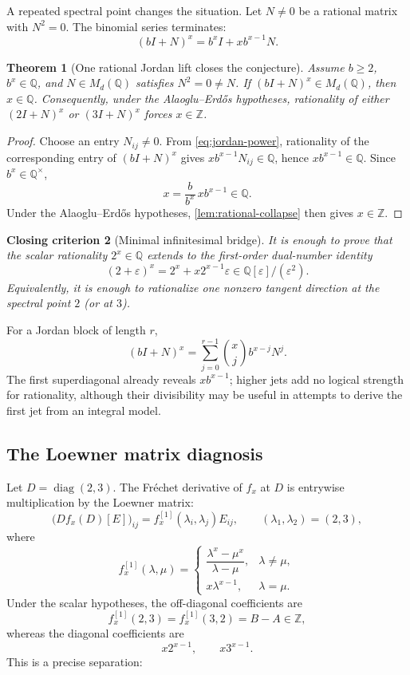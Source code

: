 \documentclass[11pt,oneside]{article}
\newtheorem{theorem}{Theorem}[section]
\newtheorem{criterion}[theorem]{Closing criterion}
\theoremstyle{definition}
\theoremstyle{remark}
\newcommand{\Z}{\mathbb Z}
\newcommand{\Q}{\mathbb Q}
\newcommand{\diag}{\operatorname{diag}}
\begin{document}
A repeated spectral point changes the situation.  Let \(N\neq0\) be a
rational matrix with \(N^2=0\).  The binomial series terminates:
\begin{equation}\label{eq:jordan-power}
        (bI+N)^x=b^xI+xb^{x-1}N.
\end{equation}

\begin{theorem}[One rational Jordan lift closes the conjecture]
\label{thm:jordan-closes}
Assume \(b\geq2\), \(b^x\in\Q\), and \(N\in M_d(\Q)\) satisfies
\(N^2=0\neq N\).  If \((bI+N)^x\in M_d(\Q)\), then \(x\in\Q\).
Consequently, under the Alaoglu--Erd\H{o}s hypotheses, rationality of
either \((2I+N)^x\) or \((3I+N)^x\) forces \(x\in\Z\).
\end{theorem}

\begin{proof}
Choose an entry \(N_{ij}\neq0\).  From
\eqref{eq:jordan-power}, rationality of the corresponding entry of
\((bI+N)^x\) gives \(xb^{x-1}N_{ij}\in\Q\), hence
\(xb^{x-1}\in\Q\).  Since \(b^x\in\Q^\times\),
\[
        x=\frac{b}{b^x}\,xb^{x-1}\in\Q.
\]
Under the Alaoglu--Erd\H{o}s hypotheses,
\cref{lem:rational-collapse} then gives \(x\in\Z\).
\end{proof}

\begin{criterion}[Minimal infinitesimal bridge]\label{crit:first-jet}
It is enough to prove that the scalar rationality \(2^x\in\Q\) extends
to the first-order dual-number identity
\[
        (2+\varepsilon)^x
        =2^x+x2^{x-1}\varepsilon
        \in\Q[\varepsilon]/(\varepsilon^2).
\]
Equivalently, it is enough to rationalize one nonzero tangent direction
at the spectral point \(2\) (or at \(3\)).
\end{criterion}

For a Jordan block of length \(r\),
\[
 (bI+N)^x
 =\sum_{j=0}^{r-1}\binom{x}{j}b^{x-j}N^j.
\]
The first superdiagonal already reveals \(xb^{x-1}\); higher jets add no
logical strength for rationality, although their divisibility may be
useful in attempts to derive the first jet from an integral model.

\subsection{The Loewner matrix diagnosis}

Let \(D=\diag(2,3)\).  The Fr\'echet derivative of \(f_x\) at \(D\) is
entrywise multiplication by the Loewner matrix:
\[
        \bigl(Df_x(D)[E]\bigr)_{ij}
        =f_x^{[1]}(\lambda_i,\lambda_j)E_{ij},
        \qquad(\lambda_1,\lambda_2)=(2,3),
\]
where
\[
 f_x^{[1]}(\lambda,\mu)=
 \begin{cases}
 \dfrac{\lambda^x-\mu^x}{\lambda-\mu},&\lambda\neq\mu,\\[1.2ex]
 x\lambda^{x-1},&\lambda=\mu.
 \end{cases}
\]
Under the scalar hypotheses, the off-diagonal coefficients are
\[
        f_x^{[1]}(2,3)=f_x^{[1]}(3,2)=B-A\in\Z,
\]
whereas the diagonal coefficients are
\[
        x2^{x-1},\qquad x3^{x-1}.
\]
This is a precise separation:
\end{document}
